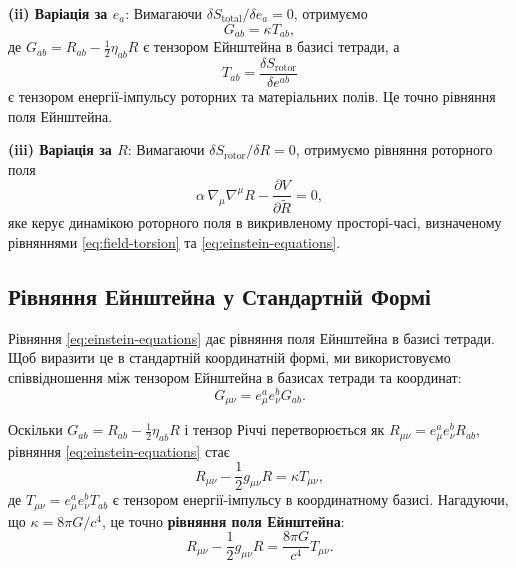 \documentclass[11pt,a4paper]{article}
\numberwithin{equation}{section}
\theoremstyle{plain}
\theoremstyle{definition}
\theoremstyle{remark}
\begin{document}
\textbf{(ii) Варіація за $e_a$}: Вимагаючи $\delta S_{\mathrm{total}}/\delta e_a = 0$, отримуємо
\begin{equation}
G_{ab} = \kappa T_{ab},
\label{eq:einstein-equations}
\end{equation}
де $G_{ab} = R_{ab} - \frac{1}{2}\eta_{ab}R$ є тензором Ейнштейна в базисі тетради, а
\begin{equation}
T_{ab} = \frac{\delta S_{\mathrm{rotor}}}{\delta e^{ab}}
\end{equation}
є тензором енергії-імпульсу роторних та матеріальних полів. Це точно рівняння поля Ейнштейна.

\textbf{(iii) Варіація за $R$}: Вимагаючи $\delta S_{\mathrm{rotor}}/\delta R = 0$, отримуємо рівняння роторного поля
\begin{equation}
\alpha\, \nabla_\mu \nabla^\mu R - \frac{\partial V}{\partial \widetilde{R}} = 0,
\label{eq:rotor-dynamics}
\end{equation}
яке керує динамікою роторного поля в викривленому просторі-часі, визначеному рівняннями \eqref{eq:field-torsion} та \eqref{eq:einstein-equations}.

\subsection{Рівняння Ейнштейна у Стандартній Формі}

Рівняння \eqref{eq:einstein-equations} дає рівняння поля Ейнштейна в базисі тетради. Щоб виразити це в стандартній координатній формі, ми використовуємо співвідношення між тензором Ейнштейна в базисах тетради та координат:
\begin{equation}
G_{\mu\nu} = e_\mu^a e_\nu^b G_{ab}.
\end{equation}

Оскільки $G_{ab} = R_{ab} - \frac{1}{2}\eta_{ab}R$ і тензор Річчі перетворюється як $R_{\mu\nu} = e_\mu^a e_\nu^b R_{ab}$, рівняння \eqref{eq:einstein-equations} стає
\begin{equation}
R_{\mu\nu} - \frac{1}{2}g_{\mu\nu}R = \kappa T_{\mu\nu},
\label{eq:einstein-standard}
\end{equation}
де $T_{\mu\nu} = e_\mu^a e_\nu^b T_{ab}$ є тензором енергії-імпульсу в координатному базисі. Нагадуючи, що $\kappa = 8\pi G/c^4$, це точно \textbf{рівняння поля Ейнштейна}:
\begin{equation}
R_{\mu\nu} - \frac{1}{2}g_{\mu\nu}R = \frac{8\pi G}{c^4} T_{\mu\nu}.
\label{eq:einstein-final}
\end{equation}
\end{document}
